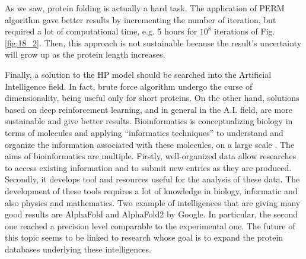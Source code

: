 As we saw, protein folding is actually a hard task.
The application of PERM algorithm gave better results by incrementing the number of iteration, but required a lot of computational time, e.g. 5 hours for $10^8$ iterations of Fig. \ref{fig:18_2}.
Then, this approach is not sustainable because the result's uncertainty will grow up as the protein length increases.


Finally, a solution to the HP model should be searched into the Artificial Intelligence field.
In fact, brute force algorithm undergo the curse of dimensionality, being useful only for short proteins.
On the other hand, solutions based on deep reinforcement learning, and in general in the A.I. field, are more sustainable and give better results.
Bioinformatics is conceptualizing biology in terms of molecules and applying ``informatics techniques'' to understand and organize the information associated with these molecules, on a large scale \cite{bioinfo}.
The aims of bioinformatics are multiple.
Firstly, well-organized data allow researches to access existing information and to submit new entries as they are produced.
Secondly, it develops tool and resources useful for the analysis of these data.
The development of these tools requires a lot of knowledge in biology, informatic and also physics and mathematics.
Two example of intelligences that are giving many good results are AlphaFold and AlphaFold2 by Google.
In particular, the second one reached a precision level comparable to the experimental one.
The future of this topic seems to be linked to research whose goal is to expand the protein databases underlying these intelligences.